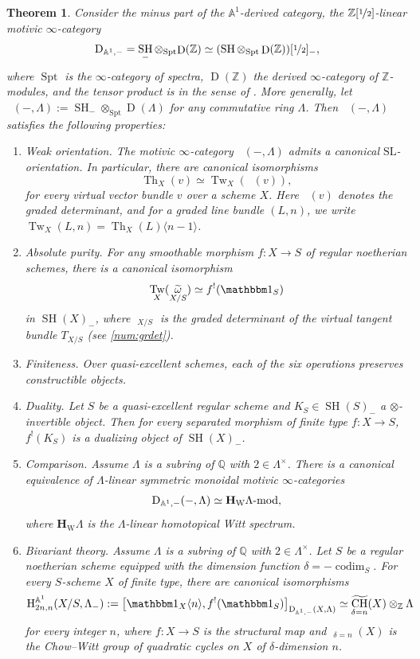 \documentclass[JEP,XML,SOM,Unicode]{cedram}
\newcommand{\modl}[1]{#1\textnormal{-}\mathrm{mod}}
\renewcommand{\AA}{\mathbb A}
\newcommand{\un}{\mathbbm 1}
\newcommand{\HW}{\mathbf H_{\mathrm{W}}}
\newcommand{\BA}{\mathrm H^{\AA^1}}
\newcommand{\SL}{\mathrm{SL}}
\DeclareMathOperator{\codim}{codim}
\DeclareMathOperator{\SH}{SH}
\DeclareMathOperator{\DAminus}{D_{\AA^1,-}}
\DeclareMathOperator{\wCH}{\widetilde{CH}}
\newcommand{\twist}[1]{\langle #1 \rangle}
\DeclareMathOperator{\Th}{Th}
\DeclareMathOperator{\Tw}{Tw}
\DeclareMathOperator{\tdet}{\widetilde \det}
\DeclareMathOperator{\tomega}{\widetilde \omega}
\DeclareMathOperator{\Der}{D}
\DeclareMathOperator{\Spt}{Spt}
\newcommand{\ZZ} {\mathbb Z}
\newcommand{\ZZot} {\mathbb Z[\nicefrac 1 2]}
\newcommand{\ot} {{\nicefrac 1 2}}
\newcommand{\QQ} {\mathbb Q}
\newtheorem{thmi}{Theorem}
\theoremstyle{remark}
\theoremstyle{definition}
\numberwithin{equation}{thm}
\begin{document}
\begin{thmi}\label{thm:intro_SHminus}
Consider the minus part of the $\AA^1$-derived category, \ie the $\ZZot$-linear motivic $\infty$-category\vspace*{-3pt}
\[
\DAminus
= \SH_- \otimes_{\Spt} {\Der(\ZZ)}
\simeq (\SH \otimes_{\Spt} \Der(\ZZ))[\ot]_-,
\]
where $\Spt$ is the $\infty$-category of spectra, $\Der(\ZZ)$ the derived $\infty$-category of $\ZZ$-modules, and the tensor product is in the sense of \cite[\S 4.8]{LurieHA}.
More generally, let $\DAminus(-, \Lambda) := \SH_- \otimes_{\Spt} \Der(\Lambda)$ for any commutative ring $\Lambda$.
Then $\DAminus(-, \Lambda)$ satisfies the following properties:

\begin{enumerate}\renewcommand{\theenumi}{\Roman{enumi}}
\item\emph{Weak orientation.}
The motivic $\infty$-category $\DAminus(-, \Lambda)$ admits a canonical $\SL$\nobreakdash-orientation.
In particular, there are canonical isomorphisms\vspace*{-3pt}
\[
\Th_X(v) \simeq \Tw_X(\tdet(v)),
\]
for every virtual vector bundle $v$ over a scheme $X$.
Here $\tdet(v)$ denotes the graded determinant, and for a graded line bundle $(L,n)$, we write \hbox{$\Tw_X(L,n) = \Th_X(L)\twist{n-1}$}.
\item\emph{Absolute purity.}
For any smoothable morphism $f : X \to S$ of regular noetherian schemes, there is a canonical isomorphism\vspace*{-3pt}
\[
\Tw_X(\tomega_{X/S})
\simeq f^!(\un_{S})
\]
in $\SH(X)_-$, where $\tomega_{X/S}$ is the graded determinant of the virtual tangent bundle $T_{X/S}$ (see \ref{num:grdet}).
\item\emph{Finiteness.}
Over quasi-excellent schemes, each of the six operations preserves constructible objects.
\item\emph{Duality.}
Let $S$ be a quasi-excellent regular scheme and $K_S \in \SH(S)_-$ a $\otimes$-invertible object.
Then for every separated morphism of finite type $f : X \to S$, $f^!(K_S)$ is a dualizing object of $\SH(X)_-$.
\item\emph{Comparison.}\label{item:intro_SHminus/comparison}
Assume $\Lambda$ is a subring of $\QQ$ with $2 \in \Lambda^\times$.
There is a canonical equivalence of $\Lambda$-linear symmetric monoidal motivic $\infty$-categories
\[
\DAminus(-, \Lambda) \simeq \modl{\HW \Lambda},
\]
where $\HW \Lambda$ is the $\Lambda$-linear homotopical Witt spectrum.
\item\emph{Bivariant theory.}
Assume $\Lambda$ is a subring of $\QQ$ with $2 \in \Lambda^\times$.
Let $S$ be a regular noetherian scheme equipped with the dimension function $\delta=-\codim_S$.
For every $S$-scheme $X$ of finite type, there are canonical isomorphisms
\[
\BA_{2n,n}(X/S, \Lambda_-)
:= \big[ \un_X\twist{n}, f^!(\un_S) \big]_{\DAminus(X, \Lambda)}
\simeq \wCH_{\delta=n}(X) \otimes_\ZZ \Lambda
\]
for every integer $n$, where $f : X \to S$ is the structural map and $\wCH_{\delta=n}(X)$ is the Chow--Witt group of quadratic cycles on $X$ of $\delta$-dimension $n$.
\end{enumerate}
\end{thmi}
\end{document}
